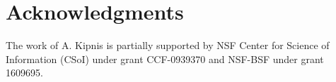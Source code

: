 \documentclass[letterpaper, conference]{IEEEtran}      %
\begin{document}
\section{Acknowledgments}
The work of A. Kipnis is partially supported by NSF Center for Science of Information (CSoI) under grant CCF-0939370 and NSF-BSF under grant 1609695.



\end{document}
